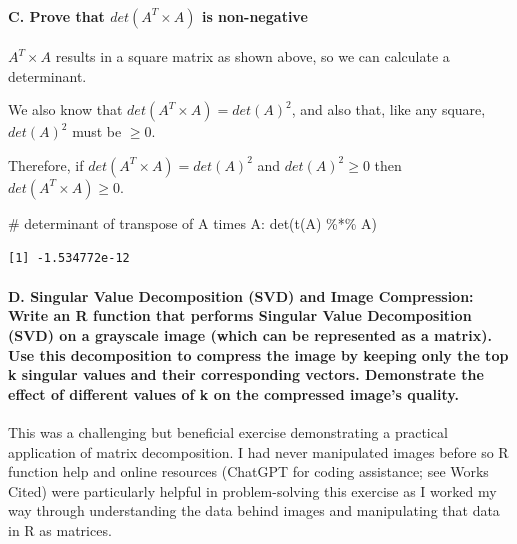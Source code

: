 \documentclass[
  letterpaper,
  DIV=11,
  numbers=noendperiod]{scrartcl}
\let\oldparagraph\paragraph
\renewcommand{\paragraph}[1]{\oldparagraph{#1}\mbox{}}
\newenvironment{Shaded}{\begin{snugshade}}{\end{snugshade}}
\newcommand{\CommentTok}[1]{\textcolor[rgb]{0.37,0.37,0.37}{#1}}
\newcommand{\FunctionTok}[1]{\textcolor[rgb]{0.28,0.35,0.67}{#1}}
\newcommand{\NormalTok}[1]{\textcolor[rgb]{0.00,0.23,0.31}{#1}}
\newcommand{\SpecialCharTok}[1]{\textcolor[rgb]{0.37,0.37,0.37}{#1}}
\begin{document}
\paragraph{\texorpdfstring{C. Prove that \(det(A^T \times A)\) is
non-negative}{C. Prove that det(A\^{}T \textbackslash times A) is non-negative}}\label{c.-prove-that-detat-times-a-is-non-negative}

\(A^T \times A\) results in a square matrix as shown above, so we can
calculate a determinant.

We also know that \(det(A^T \times A) = det(A)^2\), and also that, like
any square, \(det(A)^2\) must be \(\geq 0\).

Therefore, if \(det(A^T \times A) = det(A)^2\) and \(det(A)^2 \geq 0\)
then \(det(A^T \times A) \geq 0\).

\begin{Shaded}
\begin{Highlighting}[]
\CommentTok{\# determinant of transpose of A times A:}
\FunctionTok{det}\NormalTok{(}\FunctionTok{t}\NormalTok{(A) }\SpecialCharTok{\%*\%}\NormalTok{ A)}
\end{Highlighting}
\end{Shaded}

\begin{verbatim}
[1] -1.534772e-12
\end{verbatim}

\paragraph{D. Singular Value Decomposition (SVD) and Image Compression:
Write an R function that performs Singular Value Decomposition (SVD) on
a grayscale image (which can be represented as a matrix). Use this
decomposition to compress the image by keeping only the top k singular
values and their corresponding vectors. Demonstrate the effect of
different values of k on the compressed image's
quality.}\label{d.-singular-value-decomposition-svd-and-image-compression-write-an-r-function-that-performs-singular-value-decomposition-svd-on-a-grayscale-image-which-can-be-represented-as-a-matrix.-use-this-decomposition-to-compress-the-image-by-keeping-only-the-top-k-singular-values-and-their-corresponding-vectors.-demonstrate-the-effect-of-different-values-of-k-on-the-compressed-images-quality.}

This was a challenging but beneficial exercise demonstrating a practical
application of matrix decomposition. I had never manipulated images
before so R function help and online resources (ChatGPT for coding
assistance; see Works Cited) were particularly helpful in
problem-solving this exercise as I worked my way through understanding
the data behind images and manipulating that data in R as matrices.
\end{document}
